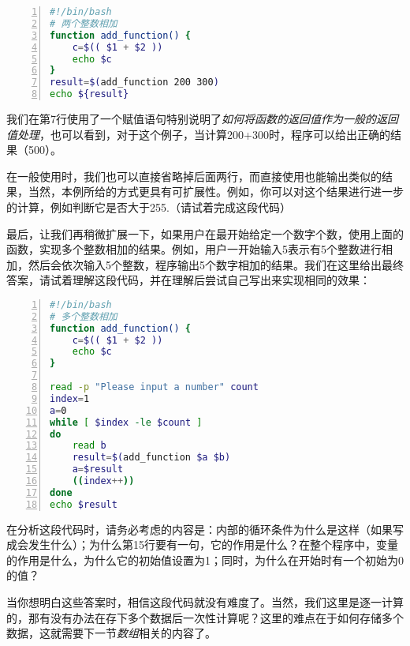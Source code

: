 \begin{lstlisting}[language=bash,numbers=left,caption={add\_function}]
#!/bin/bash
# 两个整数相加
function add_function() {
    c=$(( $1 + $2 ))
    echo $c
}
result=$(add_function 200 300)
echo ${result}
\end{lstlisting}

我们在第7行使用了一个赋值语句特别说明了\emph{如何将函数的返回值作为一般的返回值处理}，也可以看到，对于这个例子，当计算200+300时，程序可以给出正确的结果（500）。

在一般使用时，我们也可以直接省略掉后面两行，而直接使用也能输出类似的结果，当然，本例所给的方式更具有可扩展性。例如，你可以对这个结果进行进一步的计算，例如判断它是否大于255.（请试着完成这段代码）

最后，让我们再稍微扩展一下，如果用户在最开始给定一个数字个数，使用上面的函数，实现多个整数相加的结果。例如，用户一开始输入5表示有5个整数进行相加，然后会依次输入5个整数，程序输出5个数字相加的结果。我们在这里给出最终答案，请试着理解这段代码，并在理解后尝试自己写出来实现相同的效果：

\begin{lstlisting}[language=bash,numbers=left,caption={add\_function2}]
#!/bin/bash
# 多个整数相加
function add_function() {
    c=$(( $1 + $2 ))
    echo $c
}

read -p "Please input a number" count
index=1
a=0
while [ $index -le $count ]
do
    read b
    result=$(add_function $a $b)
    a=$result
    ((index++))
done
echo $result
\end{lstlisting}

在分析这段代码时，请务必考虑的内容是：内部的循环条件为什么是这样（如果写成会发生什么）；为什么第15行要有一句，它的作用是什么？在整个程序中，变量的作用是什么，为什么它的初始值设置为1；同时，为什么在开始时有一个初始为0的值？

当你想明白这些答案时，相信这段代码就没有难度了。当然，我们这里是逐一计算的，那有没有办法在存下多个数据后一次性计算呢？这里的难点在于如何存储多个数据，这就需要下一节\emph{数组}相关的内容了。




